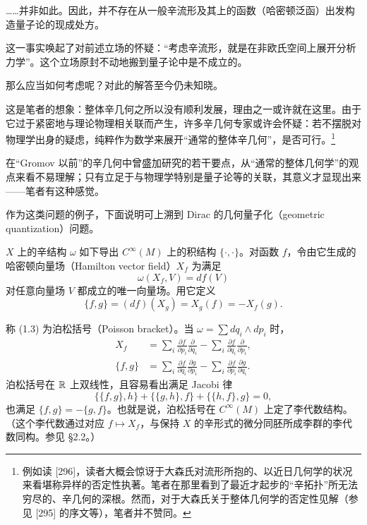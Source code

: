 ……并非如此。因此，并不存在从一般辛流形及其上的函数（哈密顿泛函）出发构造量子论的现成处方。

这一事实唤起了对前述立场的怀疑：“考虑辛流形，就是在非欧氏空间上展开分析力学”。这个立场原封不动地搬到量子论中是不成立的。

那么应当如何考虑呢？对此的解答至今仍未知晓。

这是笔者的想象：整体辛几何之所以没有顺利发展，理由之一或许就在这里。由于它过于紧密地与理论物理相关联而产生，许多辛几何专家或许会怀疑：若不摆脱对物理学出身的疑虑，纯粹作为数学来展开“通常的整体辛几何”，是否可行。\footnote{例如读 [296]，读者大概会惊讶于大森氏对流形所抱的、以近日几何学的状况来看堪称异样的否定性执著。笔者在那里看到了最近才起步的“辛拓扑”所无法穷尽的、辛几何的深根。然而，对于大森氏关于整体几何学的否定性见解（参见 [295] 的序文等），笔者并不赞同。}

在“Gromov 以前”的辛几何中曾盛加研究的若干要点，从“通常的整体几何学”的观点来看不易理解；只有立足于与物理学特别是量子论等的关联，其意义才显现出来——笔者有这种感觉。

作为这类问题的例子，下面说明可上溯到 Dirac 的几何量子化（geometric quantization）问题。

$X$ 上的辛结构 $\omega$ 如下导出 $C^\infty(M)$ 上的积结构 $\{\cdot,\cdot\}$。对函数 $f$，令由它生成的哈密顿向量场（Hamilton vector field）$X_f$ 为满足
\begin{equation}
  \omega(X_f,V)=df(V) \tag{1.2}
\end{equation}
对任意向量场 $V$ 都成立的唯一向量场。用它定义
\begin{equation}
  \{f,g\}=(df)(X_g)=X_g(f)=-X_f(g). \tag{1.3}
\end{equation}

称 (1.3) 为泊松括号（Poisson bracket）。当 $\omega=\sum dq_i\wedge dp_i$ 时，
\begin{align}
  X_f &= \sum_i \frac{\partial f}{\partial p_i}\frac{\partial}{\partial q_i}
       -\sum_i \frac{\partial f}{\partial q_i}\frac{\partial}{\partial p_i}, \tag{1.4}\\
  \{f,g\} &= \sum_i \frac{\partial f}{\partial q_i}\frac{\partial g}{\partial p_i}
       -\sum_i \frac{\partial f}{\partial p_i}\frac{\partial g}{\partial q_i}. \tag{1.5}
\end{align}
泊松括号在 $\mathbb{R}$ 上双线性，且容易看出满足 Jacobi 律
\begin{equation}
  \{\{f,g\},h\}+\{\{g,h\},f\}+\{\{h,f\},g\}=0, \tag{1.6}
\end{equation}
也满足 $\{f,g\}=-\{g,f\}$。也就是说，泊松括号在 $C^\infty(M)$ 上定了李代数结构。（这个李代数通过对应 $f\mapsto X_f$，与保持 $X$ 的辛形式的微分同胚所成李群的李代数同构。参见 §2.2。）

